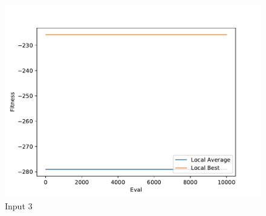 \documentclass{standalone}
\begin{document}
\begin{figure}[!htb]
	\caption{Input 3}
	\label{fig:graph_3016}
	\includegraphics[width=\textwidth]{../graphs/graphs/3016.pdf}
\end{figure}
\end{document}

